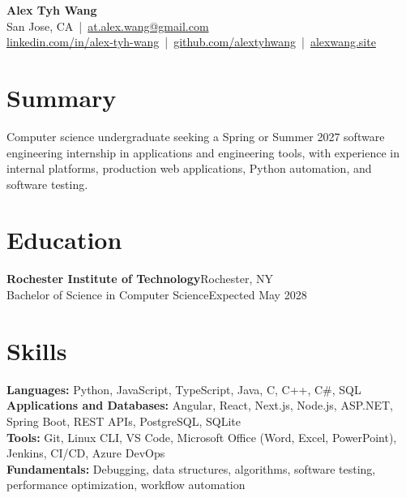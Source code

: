 \documentclass[10pt,letterpaper]{article}
\begin{document}
\begin{center}
{\Large\textbf{Alex Tyh Wang}}\\
San Jose, CA \,|\, \href{mailto:at.alex.wang@gmail.com}{at.alex.wang@gmail.com}\\
\small\href{https://www.linkedin.com/in/alex-tyh-wang/}{linkedin.com/in/alex-tyh-wang} \,|\, \href{https://github.com/alextyhwang}{github.com/alextyhwang} \,|\, \href{https://alexwang.site}{alexwang.site}
\end{center}
\section*{Summary}
Computer science undergraduate seeking a Spring or Summer 2027 software engineering internship in applications and engineering tools, with experience in internal platforms, production web applications, Python automation, and software testing.
\section*{Education}
\textbf{Rochester Institute of Technology}\hfill Rochester, NY\\
Bachelor of Science in Computer Science\hfill Expected May 2028
\section*{Skills}
\textbf{Languages:} Python, JavaScript, TypeScript, Java, C, C++, C\#, SQL\\
\textbf{Applications and Databases:} Angular, React, Next.js, Node.js, ASP.NET, Spring Boot, REST APIs, PostgreSQL, SQLite\\
\textbf{Tools:} Git, Linux CLI, VS Code, Microsoft Office (Word, Excel, PowerPoint), Jenkins, CI/CD, Azure DevOps\\
\textbf{Fundamentals:} Debugging, data structures, algorithms, software testing, performance optimization, workflow automation
\end{document}
